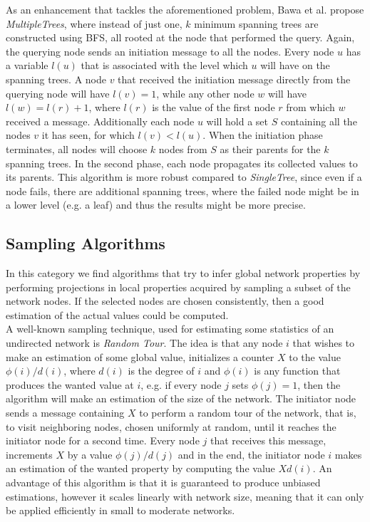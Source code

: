 \documentclass[a4paper,11pt,twoside]{report}
\begin{document}
As an enhancement that tackles the aforementioned problem, Bawa et al.\cite{Bawa03estimatingaggregates} propose \textit{MultipleTrees}, where instead of just one, $k$ minimum spanning trees are constructed using BFS, all rooted at the node that performed the query. Again, the querying node sends an initiation message to all the nodes. Every node $u$ has a variable $l(u)$ that is associated with the level which $u$ will have on the spanning trees. A node $v$ that received the initiation message directly from the querying node will have $l(v)=1$, while any other node $w$ will have $l(w)=l(r)+1$, where $l(r)$ is the value of the first node $r$ from which $w$ received a message. Additionally each node $u$ will hold a set $S$ containing all the nodes $v$ it has seen, for which $l(v)<l(u)$. When the initiation phase terminates, all nodes will choose $k$ nodes from $S$ as their parents for the $k$ spanning trees. In the second phase, each node propagates its collected values to its parents. This algorithm is more robust compared to \textit{SingleTree}, since even if a node fails, there are additional spanning trees, where the failed node might be in a lower level (e.g. a leaf) and thus the results might be more precise.


\subsection{Sampling Algorithms}

In this category we find algorithms that try to infer global network properties by performing projections in local properties acquired by sampling a subset of the network nodes. If the selected nodes are chosen consistently, then a good estimation of the actual values could be computed.\\

A well-known sampling technique, used for estimating some statistics of an undirected network is \textit{Random Tour}\cite{Massoulie:2006:PCS:1146381.1146402}. The idea is that any node $i$ that wishes to make an estimation of some global value, initializes a counter $X$ to the value $\phi(i)/d(i)$, where $d(i)$ is the degree of $i$ and $\phi(i)$ is any function that produces the wanted value at $i$, e.g. if every node $j$ sets $\phi(j)=1$, then the algorithm will make an estimation of the size of the network. The initiator node sends a message containing $X$ to perform a random tour of the network, that is, to visit neighboring nodes, chosen uniformly at random, until it reaches the initiator node for a second time. Every node $j$ that receives this message, increments $X$ by a value $\phi(j)/d(j)$ and in the end, the initiator node $i$ makes an estimation of the wanted property by computing the value $Xd(i)$. An advantage of this algorithm is that it is guaranteed to produce unbiased estimations, however it scales linearly with network size, meaning that it can only be applied efficiently in small to moderate networks.\\
\end{document}
